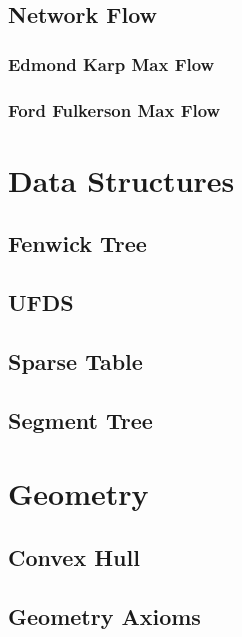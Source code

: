 \documentclass[twocolumn]{article}
\begin{document}
    \subsection{Network Flow}
        \subsubsection{Edmond Karp Max Flow}
        
        \subsubsection{Ford Fulkerson Max Flow}
        

    \newpage
    \section{Data Structures}
        \subsection{Fenwick Tree}
        
        \subsection{UFDS}
        
        \subsection{Sparse Table}
        
        \subsection{Segment Tree}
        

    \newpage
    \section{Geometry}
        \subsection{Convex Hull}
        
        \subsection{Geometry Axioms}
        
\end{document}
